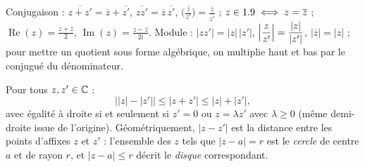 \begin{propriete}
Conjugaison : $\overline{z+z'}=\overline{z}+\overline{z'}$,
$\overline{zz'}=\overline{z}\,\overline{z'}$,
$\overline{\bigl(\frac{z}{z'}\bigr)}=\frac{\overline{z}}{\overline{z'}}$ ;
$z\in1.9\iff z=\overline{z}$ ;
$\operatorname{Re}(z)=\frac{z+\overline{z}}{2}$,
$\operatorname{Im}(z)=\frac{z-\overline{z}}{2\mathrm{i}}$.
Module : $|zz'|=|z|\,|z'|$,
$\Bigl|\dfrac{z}{z'}\Bigr|=\dfrac{|z|}{|z'|}$, $|\overline{z}|=|z|$ ;
pour mettre un quotient sous forme algébrique, on multiplie haut et bas par
le conjugué du dénominateur.
\end{propriete}

\noindent
\begin{minipage}[c]{0.6\linewidth}
\begin{theoreme}
Pour tous $z,z'\in\mathbb{C}$ :
\[
  \bigl||z|-|z'|\bigr|\leq|z+z'|\leq|z|+|z'|,
\]
avec égalité à droite si et seulement si $z'=0$ ou $z=\lambda z'$ avec
$\lambda\geq0$ (même demi-droite issue de l'origine).
Géométriquement, $|z-z'|$ est la distance entre les points d'affixes $z$ et
$z'$ : l'ensemble des $z$ tels que $|z-a|=r$ est le \emph{cercle} de centre
$a$ et de rayon $r$, et $|z-a|\leq r$ décrit le \emph{disque} correspondant.
\end{theoreme}
\end{minipage}\hfill
\begin{minipage}[c]{0.36\linewidth}
\centering
{}\\[0.5mm]
\end{minipage}


